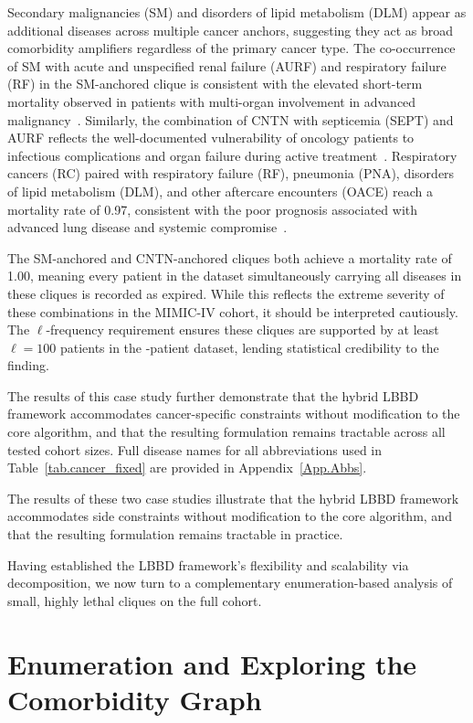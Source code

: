 Secondary malignancies (SM) and disorders of lipid metabolism (DLM)
appear as additional diseases across multiple cancer anchors,
suggesting they act as broad comorbidity amplifiers regardless of the
primary cancer type. The co-occurrence of SM with acute and
unspecified renal failure (AURF) and respiratory failure (RF) in the
SM-anchored clique is consistent with the elevated short-term
mortality observed in patients with multi-organ involvement in
advanced malignancy~\citep{Numico2015, Charlson1987}. Similarly, the
combination of CNTN with septicemia (SEPT) and AURF reflects the
well-documented vulnerability of oncology patients to infectious
complications and organ failure during active
treatment~\citep{Kuderer2011}. Respiratory cancers (RC) paired with
respiratory failure (RF), pneumonia (PNA), disorders of lipid
metabolism (DLM), and other aftercare encounters (OACE) reach a
mortality rate of 0.97, consistent with the poor prognosis associated
with advanced lung disease and systemic
compromise~\citep{Niederman2022}.

The SM-anchored and CNTN-anchored cliques both achieve a mortality
rate of 1.00, meaning every patient in the dataset simultaneously
carrying all diseases in these cliques is recorded as expired. While
this reflects the extreme severity of these combinations in the
MIMIC-IV cohort, it should be interpreted cautiously. The
$\ell$-frequency requirement ensures these cliques are supported by
at least $\ell = 100$ patients in the -patient
dataset, lending statistical credibility to the finding.

The results of this case study further demonstrate that the hybrid
LBBD framework accommodates cancer-specific constraints without
modification to the core algorithm, and that the resulting
formulation remains tractable across all tested cohort sizes. Full
disease names for all abbreviations used in
Table~\ref{tab.cancer_fixed} are provided in
Appendix~\ref{App.Abbs}.

The results of these two case studies illustrate that the hybrid LBBD framework accommodates side constraints without modification to the core algorithm, and that the resulting formulation remains tractable in practice.

Having established the LBBD framework's flexibility and scalability via decomposition, we now turn to a complementary enumeration-based analysis of small, highly lethal cliques on the full cohort.

\section{Enumeration and Exploring the Comorbidity
Graph}\label{sec.exp2-BKscalability-intro}

